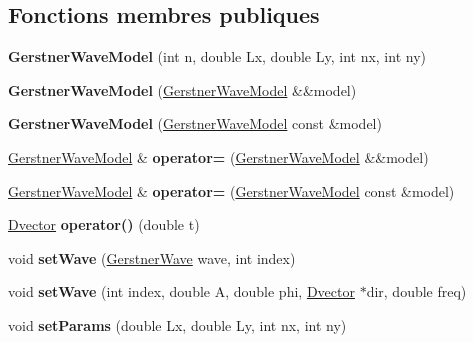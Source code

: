\subsection*{Fonctions membres publiques}
\begin{DoxyCompactItemize}
\item 
\mbox{\label{class_gerstner_wave_model_a849f46afe98eb7f2bb11df3860a91f7c}} 
{\bfseries Gerstner\+Wave\+Model} (int n, double Lx, double Ly, int nx, int ny)
\item 
\mbox{\label{class_gerstner_wave_model_adc09d3aaaee69d0e66d776d93c807d37}} 
{\bfseries Gerstner\+Wave\+Model} (\hyperlink{class_gerstner_wave_model}{Gerstner\+Wave\+Model} \&\&model)
\item 
\mbox{\label{class_gerstner_wave_model_afa36f5bb46de8f5be4b12d2b4e22cefb}} 
{\bfseries Gerstner\+Wave\+Model} (\hyperlink{class_gerstner_wave_model}{Gerstner\+Wave\+Model} const \&model)
\item 
\mbox{\label{class_gerstner_wave_model_a368e6ba6e59bb5ae666ddd3b11166f49}} 
\hyperlink{class_gerstner_wave_model}{Gerstner\+Wave\+Model} \& {\bfseries operator=} (\hyperlink{class_gerstner_wave_model}{Gerstner\+Wave\+Model} \&\&model)
\item 
\mbox{\label{class_gerstner_wave_model_ae57c58cad23189d3ddb97d7520c01341}} 
\hyperlink{class_gerstner_wave_model}{Gerstner\+Wave\+Model} \& {\bfseries operator=} (\hyperlink{class_gerstner_wave_model}{Gerstner\+Wave\+Model} const \&model)
\item 
\mbox{\label{class_gerstner_wave_model_a5c5baddcfae60132fefbdf221a468513}} 
\hyperlink{class_dvector}{Dvector} {\bfseries operator()} (double t)
\item 
\mbox{\label{class_gerstner_wave_model_ac16a0da52167986f36eb40c378f38916}} 
void {\bfseries set\+Wave} (\hyperlink{class_gerstner_wave}{Gerstner\+Wave} wave, int index)
\item 
\mbox{\label{class_gerstner_wave_model_a4cf80a87d7766e3a03f28915132b279a}} 
void {\bfseries set\+Wave} (int index, double A, double phi, \hyperlink{class_dvector}{Dvector} $\ast$dir, double freq)
\item 
\mbox{\label{class_gerstner_wave_model_abaff2e02bd7df493bb789cbffc4ebe70}} 
void {\bfseries set\+Params} (double Lx, double Ly, int nx, int ny)
\end{DoxyCompactItemize}


